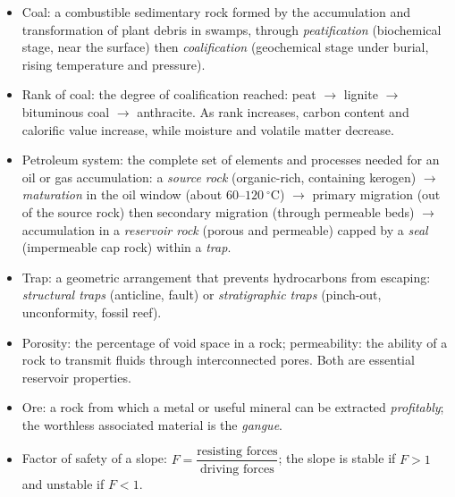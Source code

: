 \documentclass[11pt]{article}
\newcommand{\cle}[1]{{\popxbold\color{popdark}#1}}
\begin{document}
\begin{aretenir}
\begin{itemize}
\item \cle{Coal}: a combustible sedimentary rock formed by the accumulation and transformation of plant debris in swamps, through \emph{peatification} (biochemical stage, near the surface) then \emph{coalification} (geochemical stage under burial, rising temperature and pressure).
\item \cle{Rank of coal}: the degree of coalification reached: peat $\to$ lignite $\to$ bituminous coal $\to$ anthracite. As rank increases, carbon content and calorific value increase, while moisture and volatile matter decrease.
\item \cle{Petroleum system}: the complete set of elements and processes needed for an oil or gas accumulation: a \emph{source rock} (organic-rich, containing kerogen) $\to$ \emph{maturation} in the oil window (about $60$--$120\ ^\circ$C) $\to$ primary migration (out of the source rock) then secondary migration (through permeable beds) $\to$ accumulation in a \emph{reservoir rock} (porous and permeable) capped by a \emph{seal} (impermeable cap rock) within a \emph{trap}.
\item \cle{Trap}: a geometric arrangement that prevents hydrocarbons from escaping: \emph{structural traps} (anticline, fault) or \emph{stratigraphic traps} (pinch-out, unconformity, fossil reef).
\item \cle{Porosity}: the percentage of void space in a rock; \cle{permeability}: the ability of a rock to transmit fluids through interconnected pores. Both are essential reservoir properties.
\item \cle{Ore}: a rock from which a metal or useful mineral can be extracted \emph{profitably}; the worthless associated material is the \emph{gangue}.
\item \cle{Factor of safety} of a slope: $F = \dfrac{\text{resisting forces}}{\text{driving forces}}$; the slope is stable if $F>1$ and unstable if $F<1$.
\end{itemize}
\end{aretenir}
\end{document}
